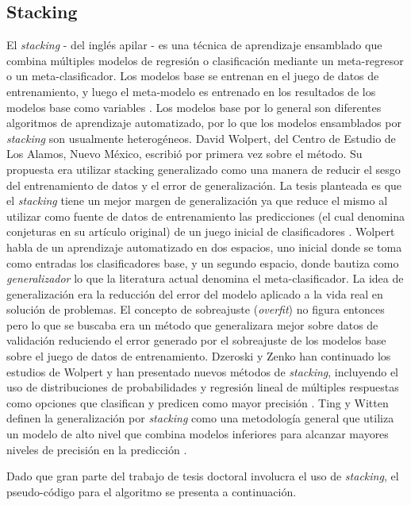 \begin{spacing}{1.5}
\subsection{Stacking}
El \emph{stacking} - del inglés apilar - es una técnica de aprendizaje ensamblado que combina múltiples modelos de regresión o clasificación mediante un meta-regresor o un meta-clasificador. Los modelos base se entrenan en el juego de datos de entrenamiento, y luego el meta-modelo es entrenado en los resultados de los modelos base como variables \cite{smolyakov}. Los modelos base por lo general son diferentes algoritmos de aprendizaje automatizado, por lo que los modelos ensamblados por \emph{stacking} son usualmente heterogéneos. David Wolpert, del Centro de Estudio de Los Alamos, Nuevo México, escribió por primera vez sobre el método. Su propuesta era utilizar stacking generalizado como una manera de reducir el sesgo del entrenamiento de datos y el error de generalización. La tesis planteada es que el \emph{stacking} tiene un mejor margen de generalización ya que reduce el mismo al utilizar como fuente de datos de entrenamiento las predicciones (el cual denomina conjeturas en su artículo original) de un juego inicial de clasificadores \cite{wolpert}. Wolpert habla de un aprendizaje automatizado en dos espacios, uno inicial donde se toma como entradas los clasificadores base, y un segundo espacio, donde bautiza como \emph{generalizador} lo que la literatura actual denomina el meta-clasificador. La idea de generalización era la reducción del error del modelo aplicado a la vida real en solución de problemas. El concepto de sobreajuste (\textit{overfit}) no figura entonces pero lo que se buscaba era un método que generalizara mejor sobre datos de validación reduciendo el error generado por el sobreajuste de los modelos base sobre el juego de datos de entrenamiento. Dzeroski y Zenko han continuado los estudios de Wolpert y han presentado nuevos métodos de \emph{stacking}, incluyendo el uso de distribuciones de probabilidades y regresión lineal de múltiples respuestas como opciones que clasifican y predicen como mayor precisión \cite{DzeroskiZenko}. Ting y Witten definen la generalización por \emph{stacking} como una metodología general que utiliza un modelo de alto nivel que combina modelos inferiores para alcanzar mayores niveles de precisión en la predicción \cite{tingwitten}.

Dado que gran parte del trabajo de tesis doctoral involucra el uso de \emph{stacking}, el pseudo-código para el algoritmo se presenta a continuación. \\


\end{spacing}
